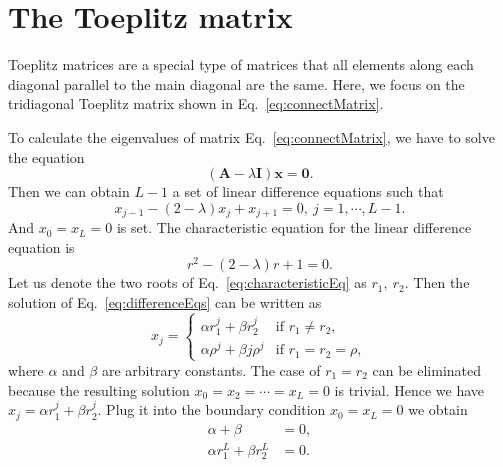 
\chapter{The Toeplitz matrix}
\label{append:teoplitz_matrix}

Toeplitz matrices are a special type of matrices that all elements along each diagonal parallel to the main diagonal are the same. Here, we focus on the tridiagonal Toeplitz matrix shown in Eq.~\eqref{eq:connectMatrix}.

To calculate the eigenvalues of matrix Eq.~\eqref{eq:connectMatrix}, we have to solve the equation 
\begin{equation}
    (\mathbf{A} - \lambda \mathbf{I}) \mathbf{x} = \mathbf{0}.
\end{equation}
Then we can obtain $L-1$ a set of linear difference equations such that
\begin{equation}
    \label{eq:differenceEqs}
    x_{j-1} - (2-\lambda)x_j + x_{j+1} = 0,~j=1,\cdots, L-1.
\end{equation}
And $x_0 = x_L = 0$ is set. The characteristic equation for the linear difference equation is
\begin{equation}
    \label{eq:characteristicEq}
    r^2 - (2-\lambda) r + 1 = 0.
\end{equation}
Let us denote the two roots of Eq.~\eqref{eq:characteristicEq} as $r_1,~r_2$. Then the solution of Eq.~\eqref{eq:differenceEqs} can be written as
\begin{equation}
    x_j = \left\{
    \begin{array}{ll}
        \alpha r_1^j + \beta r_2^j & \text{if  } r_1 \neq r_2,\\
        \alpha \rho^j + \beta j\rho^j & \text{if  } r_1 = r_2 = \rho,
  \end{array} 
  \right.
\end{equation}
where $\alpha$ and $\beta$ are arbitrary constants. The case of $r_1 = r_2$ can be eliminated because the resulting solution $x_0 = x_2 = \cdots = x_L = 0$ is trivial. Hence we have $x_j = \alpha r_1^j + \beta r_2^j$. Plug it into the boundary condition $x_0 = x_L = 0$ we obtain
\begin{subequations}
    \begin{align}
        \alpha + \beta & = 0, \\
        \alpha r_1^L + \beta r_2^L & = 0.
    \end{align}
\end{subequations}
